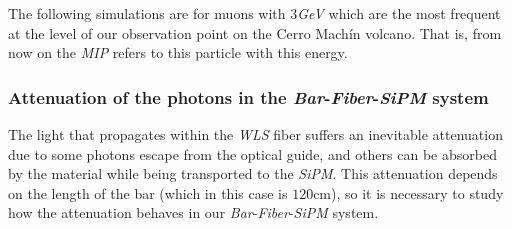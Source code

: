 \documentclass[submitting]{nst}
\begin{document}
The following simulations are for muons with $3$\textsl{GeV} which are the most frequent at the level of our observation point on the Cerro Machín volcano. That is, from now on the \textsl{MIP} refers to this particle with this energy.

\subsubsection{Attenuation of the photons in the \textsl{Bar}-\textsl{Fiber}-\textsl{SiPM} system}%
The light that propagates within the \textsl{WLS} fiber suffers an inevitable attenuation due to some photons escape from the optical guide, and others can be absorbed by the material while being transported to the \textsl{SiPM}. This attenuation depends on the length of the bar (which in this case is $120$cm), so it is necessary to study how the attenuation behaves in our \textsl{Bar}-\textsl{Fiber}-\textsl{SiPM} system. 
\end{document}
